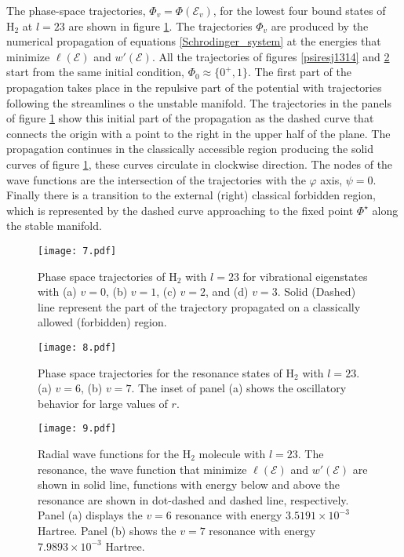 \documentclass[%
 aip,
 numerical,
 jcp,
 floatfix,
rsi,%
amsmath,amssymb,
reprint,%
author-year%
]{revtex4-1}
\begin{document}
The phase-space trajectories, $\Phi_v=\Phi(\mathcal{E}_v)$, for the lowest four bound states of $\mathrm{H}_2$ at $l=23$ are shown in figure \ref{psiresj1314}. The trajectories $\Phi_v$ are produced by the numerical propagation of equations \eqref{Schrodinger_system} at the energies that minimize $\ell(\mathcal{E})$ and $w'(\mathcal{E})$. All the trajectories of figures \eqref{psiresj1314} and \ref{respsj23} start from the same initial condition,  $\Phi_0\approx\{0^+,1\}$. The first part of the propagation takes place in the  repulsive part of the potential with trajectories following the streamlines o the unstable manifold. The trajectories in the panels of figure \ref{psiresj1314} show this initial part of the propagation as the dashed curve that connects the origin with a point to the right in the upper half of the plane. The propagation continues in the classically accessible region producing the solid curves of figure \ref{psiresj1314}, these curves circulate in clockwise direction. The nodes of the wave functions are the intersection of the trajectories with the $\varphi$ axis, $\psi=0$. Finally there is a transition to the external (right) classical forbidden region, which is represented by the dashed curve approaching to the fixed point $\Phi^\star$ along the stable manifold. 
\begin{figure}[htp]
\texttt{[image: 7.pdf]}
\caption{Phase space trajectories of H$_2$ with $l=23$ for vibrational eigenstates with (a) $v=0$, (b) $v=1$, (c) $v=2$, and (d) $v=3$. Solid (Dashed) line represent the part of the trajectory propagated on a classically allowed (forbidden) region.}\label{psiresj1314}
\end{figure}

\begin{figure}
\texttt{[image: 8.pdf]}
\caption{Phase space trajectories for the resonance states of H$_2$ with $l=23$. (a) $v=6$, (b) $v=7$. The inset of panel (a) shows the oscillatory behavior for large values of $r$.}\label{respsj23}
\end{figure}

\begin{figure}
\texttt{[image: 9.pdf]}
\caption{Radial wave functions for the $\mathrm{H}_2$ molecule with $l=23$. The resonance, the wave function that minimize $\ell(\mathcal{E})$ and $w'(\mathcal{E})$ are shown in solid line, functions with energy below and above the resonance are shown in dot-dashed and dashed line, respectively. Panel (a) displays the $v=6$ resonance with energy $3.5191\times10^{-3}$ Hartree. Panel (b) shows the $v=7$ resonance with energy $7.9893\times10^{-3}$ Hartree.}\label{resonances_radial}
\end{figure}
\end{document}
